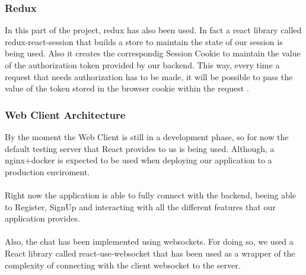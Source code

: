 \documentclass[./main.tex]{subfiles}
\begin{document}
\subsubsection{Redux}
In this part of the project, redux has also been used. In fact a react library
called redux-react-session that builds a store to maintain the state of our session is being used.
Also it creates the correspondig Session Cookie to maintain the value of the authorization token
provided by our backend. This way, every time a request that needs authorization has to be made,
it will be possible to pass the value of the token stored in the browser cookie within the request .
\subsubsection{Web Client Architecture}
By the moment the Web Client is still in a development phase, so for 
now the default testing server that React provides to us is being used.
Although, a nginx+docker is expected to be used when deploying our application
to a production enviroment.
\\\\
Right now the application is able to fully connect with the backend,
beeing able to Register, SignUp and interacting with all the different 
features that our application provides.
\\\\
Also, the chat has been implemented using websockets. For doing so, we used a React library called 
react-use-websocket that has been used as a wrapper of the complexity of connecting with the 
client websocket to the server.
\end{document}

